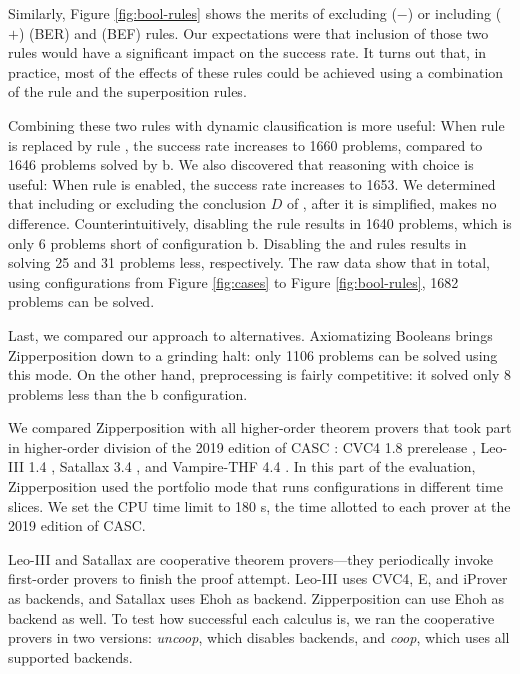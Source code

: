 Similarly, Figure \ref{fig:bool-rules} shows the merits of excluding ($-$) or including ($+$)
 (BER) and  (BEF) rules. Our
expectations were that inclusion of those two rules would have a significant impact on
the success rate. It turns out that, in practice, most of the effects of these
rules could be achieved using a combination of the  rule and the
superposition rules.
\pagebreak[2]

Combining these two rules with dynamic clausification is more useful: When rule
 is replaced by rule , the success rate increases
to 1660 problems, compared to 1646 problems solved by b. We also discovered
that reasoning with choice is useful: When rule  is enabled, the
success rate increases to 1653. We determined that including or excluding the
conclusion $D$ of , after it is simplified, makes no difference.
Counterintuitively, disabling the  rule results in 1640 problems,
which is only 6 problems short of configuration b. Disabling the  and
 rules results in solving 25 and 31 problems less,
respectively. The raw data show that in total, using configurations from Figure
\ref{fig:cases} to Figure \ref{fig:bool-rules}, 1682 problems can be solved.

Last, we compared our approach to alternatives. Axiomatizing Booleans brings
Zipperposition down to a grinding halt: only 1106 problems can be solved using
this mode. On the other hand, preprocessing is fairly competitive: it solved
only 8 problems less than the b configuration.



We compared Zipperposition with all higher-order theorem provers that took part
in higher-order division of the 2019 edition of CASC \cite{gs-19-casc27}: CVC4 1.8 prerelease \cite{cbetal-11-cvc4},
Leo-III 1.4 \cite{sb-21-leo3}, Satallax 3.4
\cite{cb-12-satallax}, and Vampire-THF 4.4
\cite{lkav-13-vampire}. In this part of the evaluation, Zipperposition
used the portfolio mode that runs configurations in different time slices. 
We set the CPU time limit to 180 s, the time allotted to each prover at the 2019 edition of CASC.


Leo-III and Satallax are cooperative theorem provers---they periodically invoke
first-order provers to finish the proof attempt. Leo-III uses CVC4, E, and
iProver \cite{kk-08-iprover} as backends, and Satallax uses Ehoh
 as backend. Zipperposition can use Ehoh as backend as well. To test how successful each calculus is, we ran
the cooperative provers in two versions: \emph{uncoop}, which disables backends,
and \emph{coop}, which uses all supported backends.



